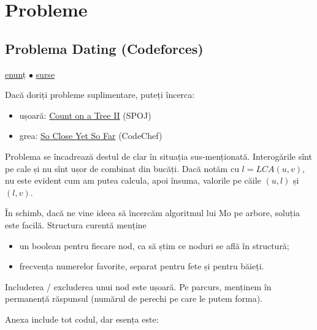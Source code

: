 \documentclass[../main.tex]{subfiles}
\begin{document}
\section{Probleme}

\subsection{Problema Dating (Codeforces)}
\label{problem:dating}

\href{https://codeforces.com/contest/852/problem/I}{enunț}
$\bullet$
\hyperref[code:dating]{surse}

Dacă doriți probleme suplimentare, puteți încerca:

\begin{itemize}
  \item ușoară: \href{https://www.spoj.com/problems/COT2/}{Count on a Tree II} (SPOJ)
  \item grea: \href{https://www.codechef.com/problems/CLOSEFAR}{So Close Yet So Far} (CodeChef)
\end{itemize}

Problema se încadrează destul de clar în situația sus-menționată. Interogările sînt pe cale și nu sînt ușor de combinat din bucăți. Dacă notăm cu $l = LCA(u,v)$, nu este evident cum am putea calcula, apoi însuma, valorile pe căile $(u, l)$ și $(l, v)$.

În schimb, dacă ne vine ideea să încercăm algoritmul lui Mo pe arbore, soluția este facilă. Structura curentă menține

\begin{itemize}
  \item un boolean pentru fiecare nod, ca să știm ce noduri se află în structură;
  \item frecvența numerelor favorite, separat pentru fete și pentru băieți.
\end{itemize}

Includerea / excluderea unui nod este ușoară. Pe parcurs, menținem în permanență răspunsul (numărul de perechi pe care le putem forma).

Anexa include tot codul, dar esența este:
\end{document}
